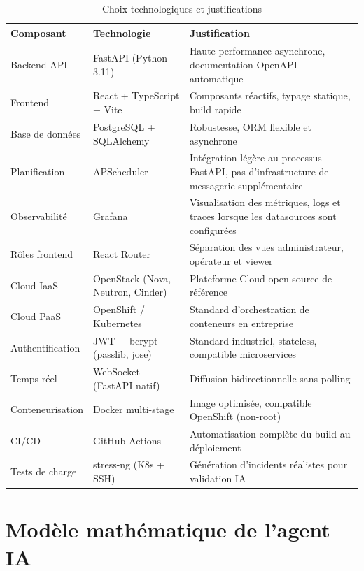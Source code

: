 \documentclass[11pt,a4paper]{report}
\begin{document}
\begin{table}[H]
\centering
\renewcommand{\arraystretch}{1.4}
\begin{tabular}{|p{3.5cm}|p{3.5cm}|p{6.5cm}|}
\hline
\textbf{Composant} & \textbf{Technologie} & \textbf{Justification} \\
\hline
Backend API & FastAPI (Python 3.11) & Haute performance asynchrone, documentation OpenAPI automatique \\
\hline
Frontend & React + TypeScript + Vite & Composants réactifs, typage statique, build rapide \\
\hline
Base de données & PostgreSQL + SQLAlchemy & Robustesse, ORM flexible et asynchrone \\
\hline
Planification & APScheduler & Intégration légère au processus FastAPI, pas d'infrastructure de messagerie supplémentaire \\
\hline
Observabilité & Grafana & Visualisation des métriques, logs et traces lorsque les datasources sont configurées \\
\hline
Rôles frontend & React Router & Séparation des vues administrateur, opérateur et viewer \\
\hline
Cloud IaaS & OpenStack (Nova, Neutron, Cinder) & Plateforme Cloud open source de référence \\
\hline
Cloud PaaS & OpenShift / Kubernetes & Standard d'orchestration de conteneurs en entreprise \\
\hline
Authentification & JWT + bcrypt (passlib, jose) & Standard industriel, stateless, compatible microservices \\
\hline
Temps réel & WebSocket (FastAPI natif) & Diffusion bidirectionnelle sans polling \\
\hline
Conteneurisation & Docker multi-stage & Image optimisée, compatible OpenShift (non-root) \\
\hline
CI/CD & GitHub Actions & Automatisation complète du build au déploiement \\
\hline
Tests de charge & stress-ng (K8s + SSH) & Génération d'incidents réalistes pour validation IA \\
\hline
\end{tabular}
\caption{Choix technologiques et justifications}
\end{table}

\section{Modèle mathématique de l'agent IA}
\end{document}
